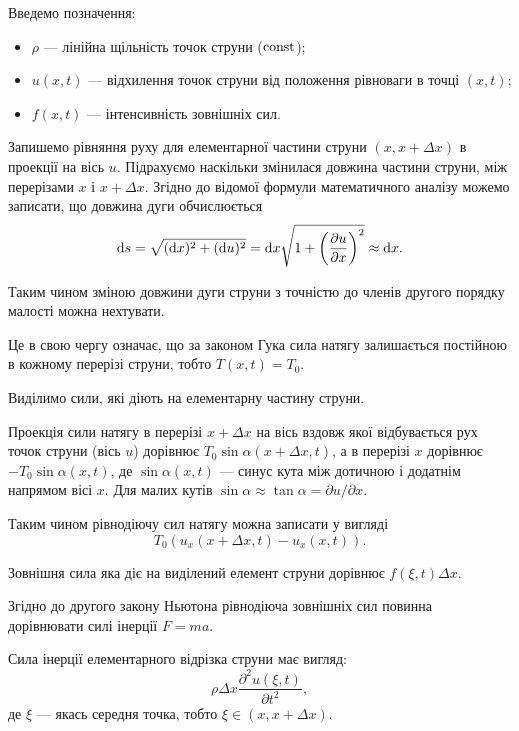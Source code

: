 Введемо позначення:
\begin{itemize}
	\item $\rho$ --- лінійна щільність точок струни ($\operatorname{const}$);
	\item $u(x, t)$ --- відхилення точок струни від положення рівноваги в точці $(x, t)$;
	\item $f(x, t)$ --- інтенсивність зовнішніх сил.
\end{itemize}

Запишемо рівняння руху для елементарної частини струни $(x, x + \Delta x)$ в проекції на вісь $u$. Підрахуємо наскільки змінилася довжина частини струни, між перерізами $x$ і $x + \Delta x$. Згідно до відомої формули математичного аналізу можемо записати, що довжина дуги обчислюється
\begin{equation}
	\mathop{}\!\mathrm{d} s = \sqrt{(\mathop{}\!\mathrm{d} x)^2 + (\mathop{}\!\mathrm{d} u)^2} = \mathop{}\!\mathrm{d} x \sqrt{1 + \left( \frac{\partial u}{\partial x} \right)^2} \approx \mathop{}\!\mathrm{d} x.
\end{equation}

Таким чином зміною довжини дуги струни з точністю до членів другого порядку малості можна нехтувати. \medskip

Це в свою чергу означає, що за законом Гука сила натягу залишається постійною в кожному перерізі струни, тобто $T(x, t) = T_0$. \medskip

Виділимо сили, які діють на елементарну частину струни. \medskip

Проекція сили натягу в перерізі $x + \Delta x$ на вісь вздовж якої відбувається рух точок струни (вісь $u$) дорівнює $T_0 \sin \alpha (x + \Delta x, t) $, а в перерізі $x$ дорівнює $-T_0 \sin \alpha(x, t)$, де $\sin \alpha(x, t)$ --- синус кута між дотичною і додатнім напрямом вісі $x$. Для малих кутів $\sin \alpha \approx \tan \alpha = \partial u / \partial x$. \medskip

Таким чином рівнодіючу сил натягу можна записати у вигляді
\begin{equation}
	T_0(u_x(x + \Delta x, t) - u_x(x, t)).
\end{equation}

Зовнішня сила яка діє на виділений елемент струни дорівнює $f(\xi, t) \Delta x$. \medskip

Згідно до другого закону Ньютона рівнодіюча зовнішніх сил повинна дорівнювати силі інерції $F = ma$. \medskip

Сила інерції елементарного відрізка струни має вигляд:
\begin{equation}
	\rho \Delta x \frac{\partial^2 u(\xi, t)}{\partial t^2},	
\end{equation}
де $\xi$ --- якась середня точка, тобто $\xi \in (x, x + \Delta x)$. \medskip

